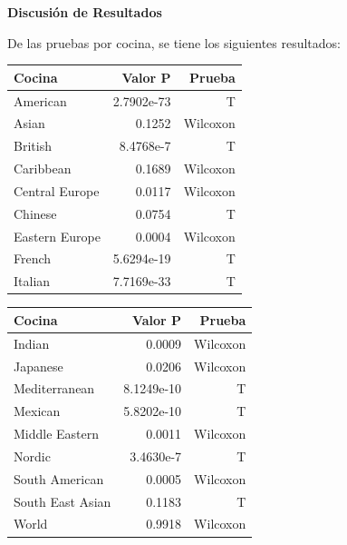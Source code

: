 \documentclass[12pt,a4paper]{article}
\begin{document}
        \textbf{Discusión de Resultados}\\
        {
            De las pruebas por cocina, se tiene los siguientes resultados:

            \begin{center}
                \begin{tabular}{lrr}
                    \toprule
                        \textbf{Cocina} & \textbf{Valor P} & \textbf{Prueba} \\
                    \midrule
                        American & 2.7902e-73 & T \\
                        Asian & 0.1252 & Wilcoxon \\
                        British & 8.4768e-7 & T \\
                        Caribbean & 0.1689 & Wilcoxon \\
                        Central Europe & 0.0117 & Wilcoxon \\
                        Chinese & 0.0754 & T \\
                        Eastern Europe & 0.0004 & Wilcoxon \\
                        French & 5.6294e-19 & T \\
                        Italian & 7.7169e-33 & T \\
                    \bottomrule
                \end{tabular}
                \begin{tabular}{lrr}
                    \toprule
                        \textbf{Cocina} & \textbf{Valor P} & \textbf{Prueba} \\
                    \midrule
                        Indian & 0.0009 & Wilcoxon \\
                        Japanese & 0.0206 & Wilcoxon \\
                        Mediterranean & 8.1249e-10 & T \\
                        Mexican & 5.8202e-10 & T \\
                        Middle Eastern & 0.0011 & Wilcoxon \\
                        Nordic & 3.4630e-7 & T \\
                        South American & 0.0005 & Wilcoxon \\
                        South East Asian & 0.1183 & T \\
                        World & 0.9918 & Wilcoxon \\
                    \bottomrule
                \end{tabular}
            \end{center}

}
\end{document}
